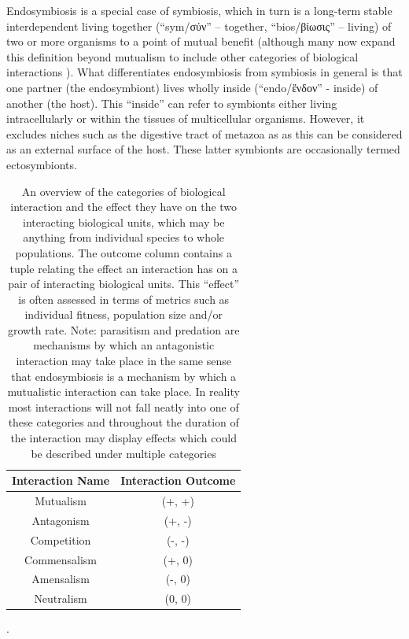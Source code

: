Endosymbiosis is a special case of symbiosis, which in turn is a long-term stable interdependent 
living together (``sym/σύν'' -- together, ``bios/βίωσις'' -- living) of two or more 
organisms to a point of mutual benefit \citep{DeBary1869,Pound1893} (although many now expand 
this definition beyond mutualism to include other categories of biological interactions \citep{Leung2008,OMalley2015}).
What differentiates endosymbiosis from symbiosis in general is that one partner (the endosymbiont) lives wholly
inside (``endo/ἔνδον'' - inside) of another (the host). This ``inside'' can refer to symbionts either living intracellularly
or within the tissues of multicellular organisms.  However, it excludes niches such as the digestive tract of metazoa as 
as this can be considered as an external surface of the host. These latter symbionts are occasionally termed ectosymbionts.
\begin{table}[h]
    \begin{tabular}{@{}cc@{}}
        \toprule
        \multicolumn{1}{r}{\textbf{Interaction Name}} & \multicolumn{1}{l}{\textbf{Interaction Outcome}} \\ 
        \midrule
        \multicolumn{1}{|c|}{Mutualism}               & \multicolumn{1}{c|}{(+, +)}                      \\
        \multicolumn{1}{|c|}{Antagonism}              & \multicolumn{1}{c|}{(+, -)}                      \\
        \multicolumn{1}{|c|}{Competition}             & \multicolumn{1}{c|}{(-, -)}                      \\
        \multicolumn{1}{|c|}{Commensalism}            & \multicolumn{1}{c|}{(+, 0)}                      \\
        \multicolumn{1}{|c|}{Amensalism}              & \multicolumn{1}{c|}{(-, 0)}                      \\
        \multicolumn{1}{|c|}{Neutralism}              & \multicolumn{1}{c|}{(0, 0)}                      \\ 
        \bottomrule
    \end{tabular}
    \caption{An overview of the categories of biological interaction and the effect they have on the two interacting
        biological units, which may be anything from individual species to whole populations. The outcome column 
        contains a tuple relating the effect an interaction has on a pair of interacting biological units. 
        This ``effect'' is often assessed in terms of metrics such as individual fitness, population size and/or
        growth rate.
        Note: parasitism and predation are mechanisms by which an antagonistic interaction may take place \citep{Abrams1987}
        in the same sense that endosymbiosis is a mechanism by which a mutualistic interaction can take place.
        In reality most interactions will not fall neatly into one of these categories and throughout the duration
        of the interaction may display effects which could be described under multiple categories \citep{Leung2008}}. 
    \label{table:biointeractions}
\end{table}

